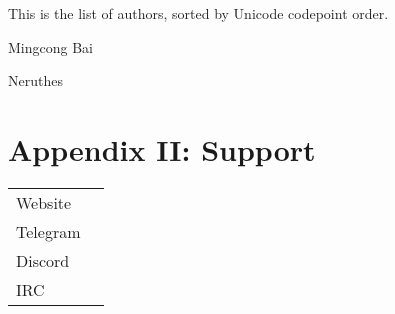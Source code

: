 
    \vspace{1ex}This is the list of authors, sorted by Unicode codepoint order.

    \begin{tcolorbox}[colframe=black,colback=white]
        \begin{compactitem}
            \item Mingcong Bai
            \item Neruthes
        \end{compactitem}
    \end{tcolorbox}

    \section{Appendix II: Support}

    \begin{tabu} {lX}
        Website &  \\
        Telegram &  \\
        Discord &  \\
        IRC &  \\
    \end{tabu}





    \clearpage
    \pagestyle{empty}

    \makebackcoverpage
